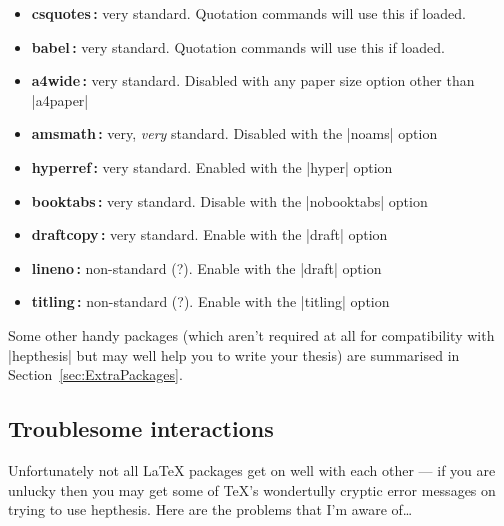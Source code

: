 \documentclass[12pt]{article}
\newcommand{\texpkg}[1]{#1}
\begin{document}
\begin{itemize}
\item \textbf{csquotes\,\cite{csquotes}:} very standard. Quotation commands will use this if loaded.
\item \textbf{babel\,\cite{babel}:} very standard. Quotation commands will use this if loaded.
\item \textbf{a4wide\,\cite{a4wide}:} very standard. Disabled with any paper size option other than |a4paper|
\item \textbf{amsmath\,\cite{amsmath}:} very, \emph{very} standard. Disabled with the |noams| option
\item \textbf{hyperref\,\cite{hyperref}:} very standard. Enabled with the |hyper| option
\item \textbf{booktabs\,\cite{booktabs}:} very standard. Disable with the |nobooktabs| option
\item \textbf{draftcopy\,\cite{draftcopy}:} very standard. Enable with the |draft| option
\item \textbf{lineno\,\cite{lineno}:} non-standard (?). Enable with the |draft| option
\item \textbf{titling\,\cite{titling}:} non-standard (?). Enable with the |titling| option
\end{itemize}

Some other handy packages (which aren't required at all for compatibility with
|hepthesis| but may well help you to write your thesis) are summarised in
Section~\ref{sec:ExtraPackages}.

\subsection{Troublesome interactions}
Unfortunately not all \LaTeX{} packages get on well with each other --- if
you are unlucky then you may get some of \TeX's wondertully cryptic error
messages on trying to use \texpkg{hepthesis}. Here are the problems that I'm
aware of\dots
\end{document}
